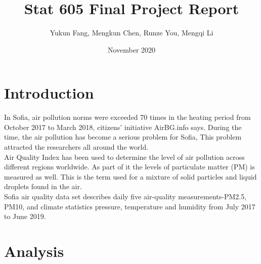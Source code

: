\documentclass{article}
\title{Stat 605 Final Project Report}
\author{Yukun Fang, Mengkun Chen, Runze You, Mengqi Li}
\date{November 2020}
\begin{document}
\maketitle

\section{Introduction}

In Sofia, air pollution norms were exceeded 70 times in the heating period from October 2017 to March 2018, citizens’ initiative AirBG.info says. During the time, the air pollution has become a serious problem for Sofia, This problem attracted the researchers all around the world.\\
\newline
Air Quality Index has been used to determine the level of air pollution across different regions worldwide. As part of it the levels of particulate matter (PM) is measured as well. This is the term used for a mixture of solid particles and liquid droplets found in the air. \\
\newline
Sofia air quality data set describes daily five air-quality measurements-PM2.5, PM10,  and climate statistics pressure, temperature
and humidity from July 2017 to June 2019.

\section{Analysis}
\end{document}
